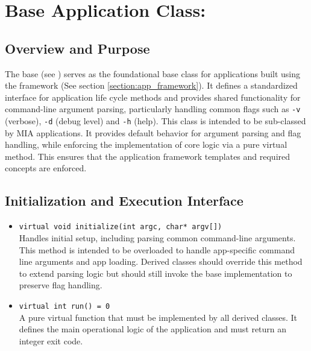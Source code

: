 \section{Base Application Class: }\label{section:base_application}

\subsection{Overview and Purpose}
The base   (see ) serves as the foundational base class for applications built using the framework (See section \ref{section:app_framework}). It defines a standardized interface for application life cycle methods and provides shared functionality for command-line argument parsing, particularly handling common flags such as \texttt{-v} (verbose), \texttt{-d} (debug level) and \texttt{-h} (help). This class is intended to be sub-classed by MIA applications. It provides default behavior for argument parsing and flag handling, while enforcing the implementation of core logic via a pure virtual  method. This ensures that the application framework templates and required concepts are enforced.

\subsection{Initialization and Execution Interface}
\begin{itemize}\itemsep0em
	\item \texttt{virtual void initialize(int argc, char* argv[])} \\
	Handles initial setup, including parsing common command-line arguments. This method is intended to be overloaded to handle app-specific command line arguments and app loading. Derived classes should override this method to extend parsing logic but should still invoke the base implementation to preserve flag handling.
\end{itemize}

\begin{itemize}\itemsep0em
	\item \texttt{virtual int run() = 0} \\
	A pure virtual function that must be implemented by all derived classes. It defines the main operational logic of the application and must return an integer exit code.
\end{itemize}

